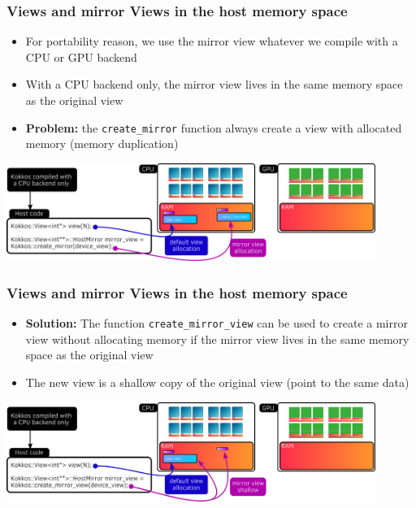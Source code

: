 \documentclass[aspectratio=169]{beamer}
\begin{document}

\begin{frame}[fragile]
    \frametitle{Views and mirror Views in the host memory space}

\begin{itemize}
\item For portability reason, we use the mirror view whatever we compile with a CPU or GPU backend
\item With a CPU backend only, the mirror view lives in the same memory space as the original view
\item \textbf{Problem:} the \texttt{create\_mirror} function always create a view with allocated memory (memory duplication)
\end{itemize}

\begin{center}
    \includegraphics[width=0.9\textwidth]{../../images/host_mirror_view.png}
\end{center}

\end{frame}



\begin{frame}[fragile]
    \frametitle{Views and mirror Views in the host memory space}

\begin{itemize}
    \item \textbf{Solution:} The function \texttt{create\_mirror\_view} can be used to create a mirror view without allocating memory if the mirror view lives in the same memory space as the original view
    \item The new view is a shallow copy of the original view (point to the same data)
\end{itemize}

\begin{center}
    \includegraphics[width=0.9\textwidth]{../../images/host_create_mirror_view.png}
\end{center}

\end{frame}
\end{document}
